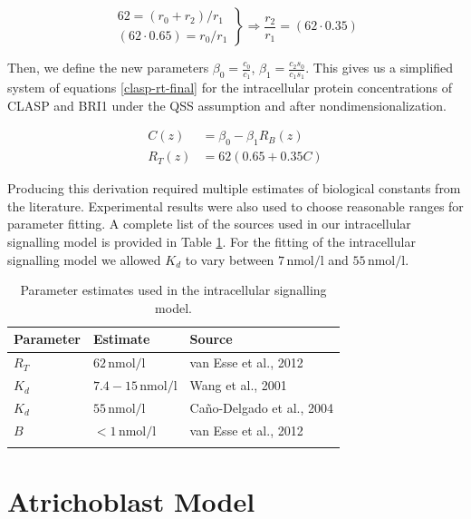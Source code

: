 \documentclass[referee,pdflatex,sn-mathphys-num]{sn-jnl}
\newcommand{\nm}{\,\unit{\nano\mole\per\litre}}
\begin{document}
\begin{appendices}
\begin{equation}
\label{clasp-simplified}
\left.\begin{aligned}
  62 = (r_{0} + r_{2}) / r_{1} \\
  (62 \cdot 0.65) = r_{0} / r_{1}
\end{aligned}\right\rbrace \Rightarrow  \frac{r_{2}}{r_{1}} = (62 \cdot 0.35)
\end{equation}

Then, we define the new parameters $\beta_{0} = \frac{c_{0}}{c_{1}}$, $\beta_{1} = \frac{c_{2}s_{0}}{c_{1}s_{1}}$.
This gives us a simplified system of equations \eqref{clasp-rt-final} for the intracellular protein concentrations of CLASP and BRI1 under the QSS assumption and after nondimensionalization.

\begin{equation}
\label{clasp-rt-final}
\begin{aligned}
  C(z) &= \beta_{0} - \beta_{1}R_{B}(z) \\[5pt]
  R_{T}(z) &= 62 (0.65 + 0.35 C)
\end{aligned}
\end{equation}

Producing this derivation required multiple estimates of biological constants from the literature.
Experimental results were also used to choose reasonable ranges for parameter fitting.
A complete list of the sources used in our intracellular signalling model is provided in Table \ref{parameter-values}.
For the fitting of the intracellular signalling model we allowed $K_{d}$ to vary between $7\nm$ and $55\nm$.

\begin{table}[!ht]
\centering
\caption{Parameter estimates used in the intracellular signalling model.} 
\label{parameter-values}
\begin{tabular}{@{}lll@{}}
\toprule
Parameter & Estimate & Source \\ 
\midrule
$R_{T}$ & $62\nm$ & van Esse et al., 2012 \cite{vanesse2012} \\
$K_{d}$ & $7.4-15\nm$ & Wang et al., 2001 \cite{wang2001} \\
$K_{d}$ & $55\nm$ & Ca\~no-Delgado et al., 2004 \cite{cano-delgado2004} \\
$B$ & $<1 \nm$ & van Esse et al., 2012 \cite{vanesse2012} \\
\botrule
\end{tabular}
\end{table}

\section{Atrichoblast Model}\label{secA4}


\end{appendices}
\end{document}
